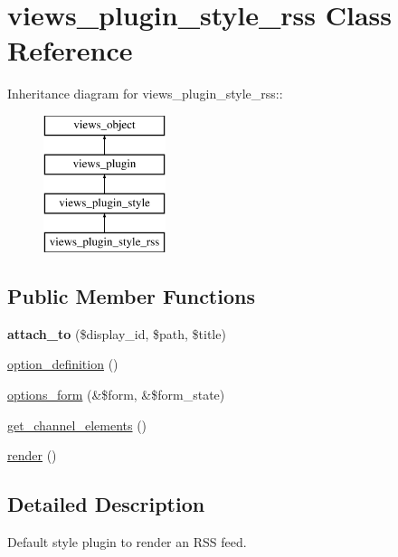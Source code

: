 \hypertarget{classviews__plugin__style__rss}{
\section{views\_\-plugin\_\-style\_\-rss Class Reference}
\label{classviews__plugin__style__rss}
}
Inheritance diagram for views\_\-plugin\_\-style\_\-rss::\begin{figure}[H]
\begin{center}
\leavevmode
\includegraphics[height=4cm]{classviews__plugin__style__rss}
\end{center}
\end{figure}
\subsection*{Public Member Functions}
\begin{CompactItemize}
\item 
\hypertarget{classviews__plugin__style__rss_9cd5c1f8c310e28c6e6f99d4fc4ed295}{
\textbf{attach\_\-to} (\$display\_\-id, \$path, \$title)}
\label{classviews__plugin__style__rss_9cd5c1f8c310e28c6e6f99d4fc4ed295}

\item 
\hyperlink{classviews__plugin__style__rss_b65464713d5256b32dbb4eea3e6d76ed}{option\_\-definition} ()
\item 
\hyperlink{classviews__plugin__style__rss_317b1867ddd97f969977368031e04fee}{options\_\-form} (\&\$form, \&\$form\_\-state)
\item 
\hyperlink{classviews__plugin__style__rss_fce443c4f7053fc7e9a2043ae0848cd7}{get\_\-channel\_\-elements} ()
\item 
\hyperlink{classviews__plugin__style__rss_a6331538ac5b9cdc80478f98ba5e0de4}{render} ()
\end{CompactItemize}


\subsection{Detailed Description}
Default style plugin to render an RSS feed. 

